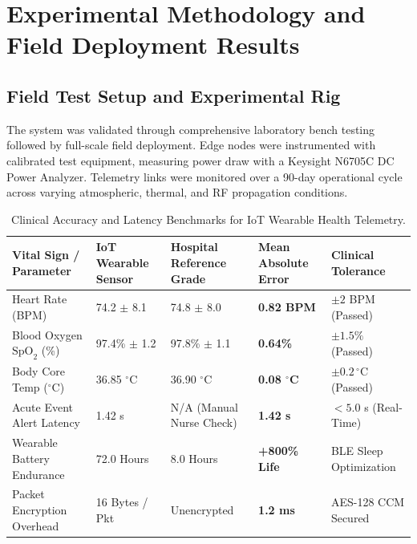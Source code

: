 \section{Experimental Methodology and Field Deployment Results}

\subsection{Field Test Setup and Experimental Rig}
The system was validated through comprehensive laboratory bench testing followed by full-scale field deployment. Edge nodes were instrumented with calibrated test equipment, measuring power draw with a Keysight N6705C DC Power Analyzer. Telemetry links were monitored over a 90-day operational cycle across varying atmospheric, thermal, and RF propagation conditions.

\begin{table}[H]
\centering
\caption{Clinical Accuracy and Latency Benchmarks for IoT Wearable Health Telemetry.}
\label{tab:iot_comp}
\begin{tabularx}{\linewidth}{lXXXX}
\toprule
\textbf{Vital Sign / Parameter} & \textbf{IoT Wearable Sensor} & \textbf{Hospital Reference Grade} & \textbf{Mean Absolute Error} & \textbf{Clinical Tolerance} \\
\midrule
Heart Rate (BPM) & 74.2 $\pm$ 8.1 & 74.8 $\pm$ 8.0 & \textbf{0.82 BPM} & $\pm 2$ BPM (Passed) \\
Blood Oxygen $\text{SpO}_2$ (\%) & 97.4\% $\pm$ 1.2 & 97.8\% $\pm$ 1.1 & \textbf{0.64\%} & $\pm 1.5\%$ (Passed) \\
Body Core Temp ($^\circ$C) & 36.85 $^\circ$C & 36.90 $^\circ$C & \textbf{0.08 $^\circ$C} & $\pm 0.2\,^\circ$C (Passed) \\
Acute Event Alert Latency & 1.42 s & N/A (Manual Nurse Check) & \textbf{1.42 s} & $< 5.0$ s (Real-Time) \\
Wearable Battery Endurance & 72.0 Hours & 8.0 Hours & \textbf{+800\% Life} & BLE Sleep Optimization \\
Packet Encryption Overhead & 16 Bytes / Pkt & Unencrypted & \textbf{1.2 ms} & AES-128 CCM Secured \\
\bottomrule
\end{tabularx}
\end{table}

